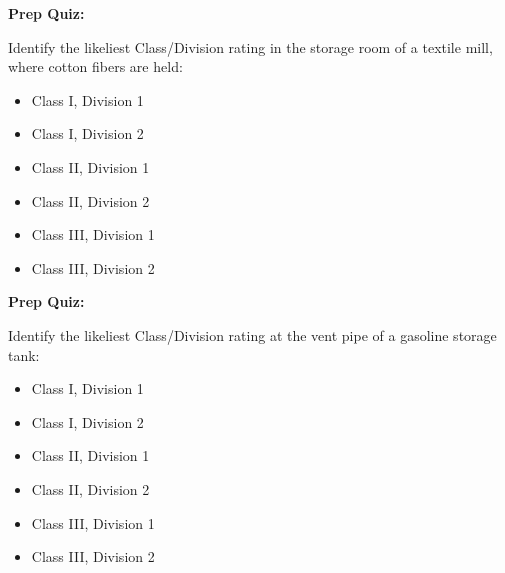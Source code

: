 \vfil \eject

\noindent
{\bf Prep Quiz:}

Identify the likeliest Class/Division rating in the storage room of a textile mill, where cotton fibers are held:

\begin{itemize}
\item{} Class I, Division 1 
\vskip 5pt 
\item{} Class I, Division 2 
\vskip 5pt 
\item{} Class II, Division 1
\vskip 5pt 
\item{} Class II, Division 2 
\vskip 5pt 
\item{} Class III, Division 1
\vskip 5pt 
\item{} Class III, Division 2
\end{itemize}


\vfil \eject

\noindent
{\bf Prep Quiz:}

Identify the likeliest Class/Division rating at the vent pipe of a gasoline storage tank: 

\begin{itemize}
\item{} Class I, Division 1 
\vskip 5pt 
\item{} Class I, Division 2 
\vskip 5pt 
\item{} Class II, Division 1
\vskip 5pt 
\item{} Class II, Division 2 
\vskip 5pt 
\item{} Class III, Division 1
\vskip 5pt 
\item{} Class III, Division 2
\end{itemize}







